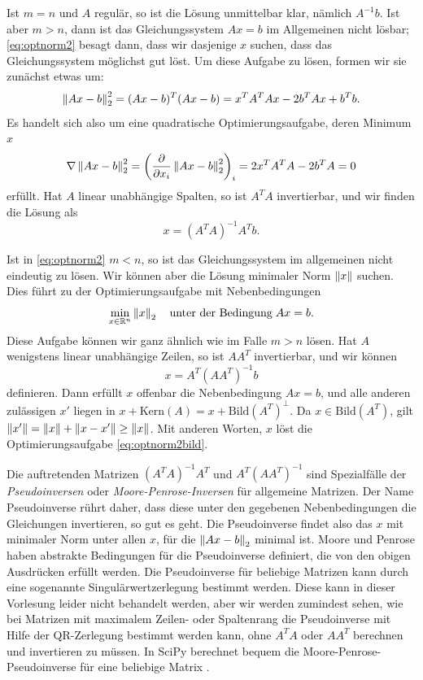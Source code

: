 Ist $m = n$ und $A$ regulär, so ist die Lösung unmittelbar klar,
nämlich $A^{-1}b$. Ist aber $m>n$, dann ist das Gleichungssystem
$Ax=b$ im Allgemeinen nicht lösbar; \eqref{eq:optnorm2} besagt dann,
dass wir dasjenige $x$ suchen, dass das Gleichungssystem möglichst gut
löst. Um diese Aufgabe zu lösen, formen wir sie zunächst etwas um:
\begin{equation}
  \left\lVert{Ax - b}\right\rVert^2_2 = (Ax - b)^T(Ax - b)
  = x^TA^TAx - 2b^TAx + b^Tb.
\end{equation}
Es handelt sich also um eine quadratische Optimierungsaufgabe, deren
Minimum $x$
\begin{equation}
  \nabla \left\lVert{Ax - b}\right\rVert^2_2 = \left(\frac{\partial}{\partial x_i} \left\lVert{Ax -
    b}\right\rVert^2_2\right)_i = 2x^TA^TA - 2b^TA = 0
\end{equation}
erfüllt. Hat $A$ linear unabhängige Spalten, so ist $A^TA$ invertierbar,
und wir finden die Lösung als
\begin{equation}
  x = (A^TA)^{-1}A^Tb.
\end{equation}

Ist in \eqref{eq:optnorm2} $m < n$, so ist das Gleichungssystem im
allgemeinen nicht eindeutig zu lösen. Wir können aber die Lösung
minimaler Norm $\left\lVert{x}\right\rVert$ suchen. Dies führt zu der
Optimierungsaufgabe mit Nebenbedingungen
\begin{equation}
  \label{eq:optnorm2bild}
  \min_{x\in\mathbb{R}^n} \left\lVert{x}\right\rVert_2\quad\text{unter der Bedingung}\; Ax=b.
\end{equation}
Diese Aufgabe können wir ganz ähnlich wie im Falle $m>n$ lösen. Hat
$A$ wenigstens linear unabhängige Zeilen, so ist $AA^T$ invertierbar,
und wir können
\begin{equation}
  x = A^T(AA^T)^{-1}b
\end{equation}
definieren. Dann erfüllt $x$ offenbar die Nebenbedingung $Ax=b$, und
alle anderen zulässigen $x'$ liegen in $x + \text{Kern}(A) = x +
\text{Bild}(A^T)^\perp$. Da $x\in\text{Bild}(A^T)$, gilt
$\left\lVert{x'}\right\rVert=\left\lVert{x}\right\rVert + \left\lVert{x-x'}\right\rVert\ge \left\lVert{x}\right\rVert$. Mit anderen Worten,
$x$ löst die Optimierungsaufgabe \eqref{eq:optnorm2bild}.

Die auftretenden Matrizen $(A^TA)^{-1}A^T$ und $A^T(AA^T)^{-1}$ sind
Spezialfälle der \emph{Pseudoinversen} oder
\emph{Moore-Penrose-Inversen} für allgemeine Matrizen. Der Name
Pseudoinverse rührt daher, dass diese unter den gegebenen
Nebenbedingungen die Gleichungen invertieren, so gut es geht. Die
Pseudoinverse findet also das $x$ mit minimaler Norm unter allen $x$,
für die $\left\lVert{Ax-b}\right\rVert_2$ minimal ist.  Moore und Penrose haben
abstrakte Bedingungen für die Pseudoinverse definiert, die von den
obigen Ausdrücken erfüllt werden. Die Pseudoinverse für beliebige
Matrizen kann durch eine sogenannte Singulärwertzerlegung bestimmt
werden. Diese kann in dieser Vorlesung leider nicht behandelt
werden, aber wir werden zumindest sehen, wie bei Matrizen mit
maximalem Zeilen- oder Spaltenrang die Pseudoinverse mit Hilfe
der QR-Zerlegung bestimmt werden kann, ohne $A^TA$ oder $AA^T$
berechnen und invertieren zu müssen. In SciPy berechnet
 bequem die Moore-Penrose-Pseudoinverse
für eine beliebige Matrix .

